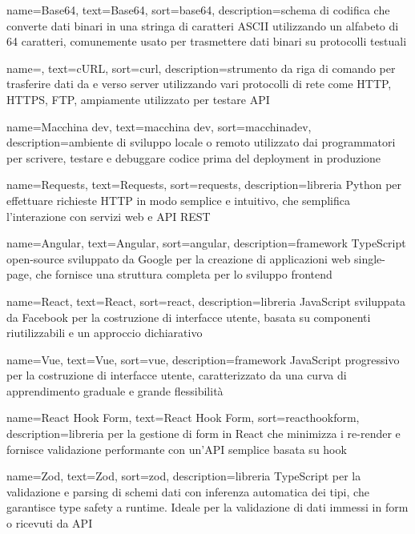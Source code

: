  {
    name=Base64,
    text=Base64,
    sort=base64,
    description={schema di codifica che converte dati binari in una stringa di caratteri ASCII utilizzando un alfabeto di 64 caratteri, comunemente usato per trasmettere dati binari su protocolli testuali}
}

 {
    name=,
    text=cURL,
    sort=curl,
    description={strumento da riga di comando per trasferire dati da e verso server utilizzando vari protocolli di rete come HTTP, HTTPS, FTP, ampiamente utilizzato per testare API}
}

 {
    name=Macchina dev,
    text=macchina dev,
    sort=macchinadev,
    description={ambiente di sviluppo locale o remoto utilizzato dai programmatori per scrivere, testare e debuggare codice prima del deployment in produzione}
}

 {
    name=Requests,
    text=Requests,
    sort=requests,
    description={libreria Python per effettuare richieste HTTP in modo semplice e intuitivo, che semplifica l'interazione con servizi web e API REST}
}

 {
    name=Angular,
    text=Angular,
    sort=angular,
    description={framework TypeScript open-source sviluppato da Google per la creazione di applicazioni web single-page, che fornisce una struttura completa per lo sviluppo frontend}
}

 {
    name=React,
    text=React,
    sort=react,
    description={libreria JavaScript sviluppata da Facebook per la costruzione di interfacce utente, basata su componenti riutilizzabili e un approccio dichiarativo}
}

 {
    name=Vue,
    text=Vue,
    sort=vue,
    description={framework JavaScript progressivo per la costruzione di interfacce utente, caratterizzato da una curva di apprendimento graduale e grande flessibilità}
}

 {
    name=React Hook Form,
    text=React Hook Form,
    sort=reacthookform,
    description={libreria per la gestione di form in React che minimizza i re-render e fornisce validazione performante con un'API semplice basata su hook}
}

 {
    name=Zod,
    text=Zod,
    sort=zod,
    description={libreria TypeScript per la validazione e parsing di schemi dati con inferenza automatica dei tipi, che garantisce type safety a runtime. Ideale per la validazione di dati immessi in form o ricevuti da API}
}

